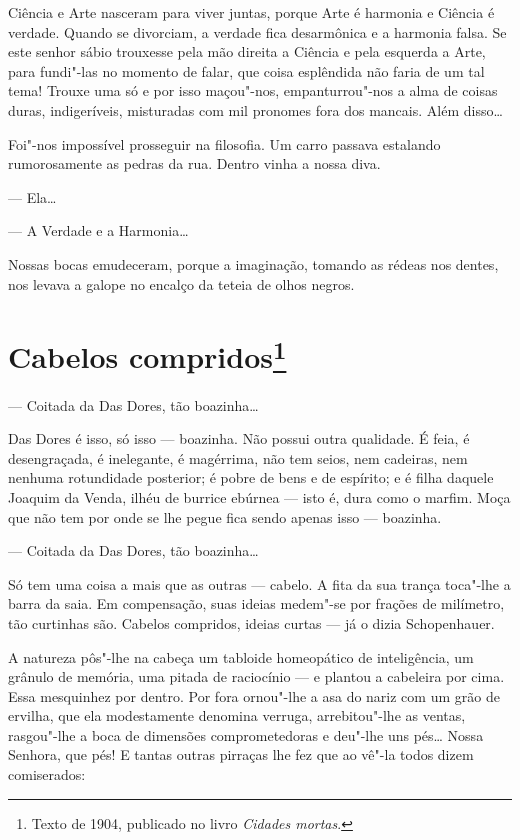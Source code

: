 Ciência e Arte nasceram para viver juntas, porque Arte é harmonia e
Ciência é verdade. Quando se divorciam, a verdade fica desarmônica e a
harmonia falsa. Se este senhor sábio trouxesse pela mão direita a
Ciência e pela esquerda a Arte, para fundi"-las no momento de falar, que
coisa esplêndida não faria de um tal tema! Trouxe uma só e por isso
maçou"-nos, empanturrou"-nos a alma de coisas duras, indigeríveis,
misturadas com mil pronomes fora dos mancais. Além disso\ldots{}

Foi"-nos impossível prosseguir na filosofia. Um carro passava estalando
rumorosamente as pedras da rua. Dentro vinha a nossa diva.

--- Ela\ldots{}

--- A Verdade e a Harmonia\ldots{}

Nossas bocas emudeceram, porque a imaginação, tomando as rédeas nos
dentes, nos levava a galope no encalço da teteia de olhos negros.

\chapter{Cabelos compridos\footnote[*]{Texto de 1904, publicado no livro \emph{Cidades mortas}.}}

--- Coitada da Das Dores, tão boazinha\ldots{}

Das Dores é isso, só isso --- boazinha. Não possui outra qualidade. É
feia, é desengraçada, é inelegante, é magérrima, não tem seios, nem
cadeiras, nem nenhuma rotundidade posterior; é pobre de bens e de
espírito; e é filha daquele Joaquim da Venda, ilhéu de burrice ebúrnea
--- isto é, dura como o marfim. Moça que não tem por onde se lhe pegue
fica sendo apenas isso --- boazinha.

--- Coitada da Das Dores, tão boazinha\ldots{}

Só tem uma coisa a mais que as outras --- cabelo. A fita da sua trança
toca"-lhe a barra da saia. Em compensação, suas ideias medem"-se por
frações de milímetro, tão curtinhas são. Cabelos compridos, ideias
curtas --- já o dizia Schopenhauer.

A natureza pôs"-lhe na cabeça um tabloide homeopático de inteligência, um
grânulo de memória, uma pitada de raciocínio --- e plantou a cabeleira
por cima. Essa mesquinhez por dentro. Por fora ornou"-lhe a asa do nariz
com um grão de ervilha, que ela modestamente denomina verruga,
arrebitou"-lhe as ventas, rasgou"-lhe a boca de dimensões comprometedoras
e deu"-lhe uns pés\ldots{} Nossa Senhora, que pés! E tantas outras pirraças
lhe fez que ao vê"-la todos dizem comiserados:

